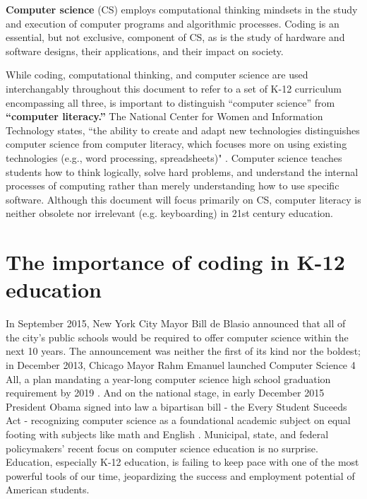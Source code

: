 \textbf{Computer science} (CS) employs computational thinking mindsets in the study and execution of computer programs and algorithmic processes. Coding is an essential, but not exclusive, component of CS, as is the study of hardware and software designs, their applications, and their impact on society. \par
While coding, computational thinking, and computer science are used interchangably throughout this document to refer to a set of K-12 curriculum encompassing all three, is important to distinguish ``computer science'' from \textbf{``computer literacy.''} The National Center for Women and Information Technology states, ``the ability to create and adapt new technologies distinguishes computer science from computer literacy, which focuses more on using existing technologies (e.g., word processing, spreadsheets)" \cite{wit}. Computer science teaches students how to think logically, solve hard problems, and understand the internal processes of computing rather than merely understanding how to use specific software. Although this document will focus primarily on CS, computer literacy is neither obsolete nor irrelevant (e.g. keyboarding) in 21st century education. \par  


\section{The importance of coding in K-12 education}
In September 2015, New York City Mayor Bill de Blasio announced that all of the city’s public schools would be required to offer computer science within the next 10 years. The announcement was neither the first of its kind nor the boldest; in December 2013, Chicago Mayor Rahm Emanuel launched Computer Science 4 All, a plan mandating a year-long computer science high school graduation requirement by 2019 \cite{chicagoCS}. And on the national stage, in early December 2015 President Obama signed into law a bipartisan bill - the Every Student Suceeds Act - recognizing computer science as a foundational academic subject on equal footing with subjects like math and English \cite{WSJref}. Municipal, state, and federal policymakers' recent focus on computer science education is no surprise. Education, especially K-12 education, is failing to keep pace with one of the most powerful tools of our time, jeopardizing the success and employment potential of American students.\par

